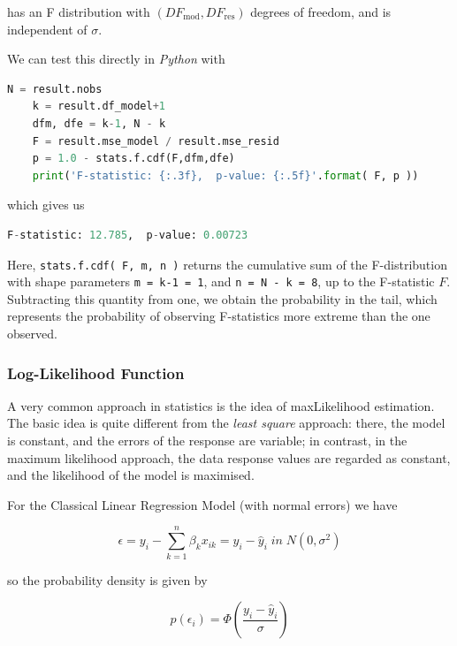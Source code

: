 has an F distribution with $(DF_\text{mod}, DF_\text{res})$ degrees of freedom, and is independent of $\sigma$.

We can test this directly in \emph{Python} with

\begin{lstlisting}[language=Python]
    N = result.nobs
    k = result.df_model+1
    dfm, dfe = k-1, N - k
    F = result.mse_model / result.mse_resid
    p = 1.0 - stats.f.cdf(F,dfm,dfe)
    print('F-statistic: {:.3f},  p-value: {:.5f}'.format( F, p ))
\end{lstlisting}

which gives us

\begin{lstlisting}[language=Python]
    F-statistic: 12.785,  p-value: 0.00723
\end{lstlisting}

Here, \lstinline{stats.f.cdf( F, m, n )} returns the cumulative sum of the F-distribution with shape parameters \lstinline{m = k-1 = 1}, and \lstinline{n = N - k = 8}, up to the F-statistic $F$. Subtracting this quantity from one, we obtain the probability in the tail, which represents the probability of observing F-statistics more extreme than the one observed.

\subsubsection{Log-Likelihood Function}

A very common approach in statistics is the idea of \gls{maxLikelihood} estimation.  The basic idea is quite different from the \emph{least square} approach: there, the model is constant, and the errors of the response are variable; in contrast, in the maximum likelihood approach, the data response values are regarded as constant, and the likelihood of the model is maximised.

For the Classical Linear Regression Model (with normal errors) we have

\begin{equation}
  \epsilon = y_i - \sum_{k=1}^n \beta_k x_{ik} = y_i - \hat{y}_i \; in \; N(0, \sigma^2)
\end{equation}

so the probability density is given by

\begin{equation}
  p(\epsilon_i) =  \Phi (\frac{y_i - \hat{y}_i}{\sigma})
\end{equation}

